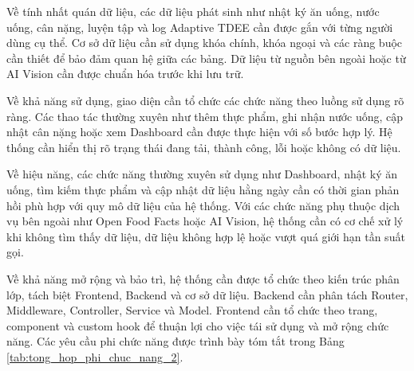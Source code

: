 \documentclass[12pt, a4paper]{report}
\begin{document}
Về tính nhất quán dữ liệu, các dữ liệu phát sinh như nhật ký ăn uống, nước uống, cân nặng, luyện tập và log Adaptive TDEE cần được gắn với từng người dùng cụ thể. Cơ sở dữ liệu cần sử dụng khóa chính, khóa ngoại và các ràng buộc cần thiết để bảo đảm quan hệ giữa các bảng. Dữ liệu từ nguồn bên ngoài hoặc từ AI Vision cần được chuẩn hóa trước khi lưu trữ.

Về khả năng sử dụng, giao diện cần tổ chức các chức năng theo luồng sử dụng rõ ràng. Các thao tác thường xuyên như thêm thực phẩm, ghi nhận nước uống, cập nhật cân nặng hoặc xem Dashboard cần được thực hiện với số bước hợp lý. Hệ thống cần hiển thị rõ trạng thái đang tải, thành công, lỗi hoặc không có dữ liệu.

Về hiệu năng, các chức năng thường xuyên sử dụng như Dashboard, nhật ký ăn uống, tìm kiếm thực phẩm và cập nhật dữ liệu hằng ngày cần có thời gian phản hồi phù hợp với quy mô dữ liệu của hệ thống. Với các chức năng phụ thuộc dịch vụ bên ngoài như Open Food Facts hoặc AI Vision, hệ thống cần có cơ chế xử lý khi không tìm thấy dữ liệu, dữ liệu không hợp lệ hoặc vượt quá giới hạn tần suất gọi.

Về khả năng mở rộng và bảo trì, hệ thống cần được tổ chức theo kiến trúc phân lớp, tách biệt Frontend, Backend và cơ sở dữ liệu. Backend cần phân tách Router, Middleware, Controller, Service và Model. Frontend cần tổ chức theo trang, component và custom hook để thuận lợi cho việc tái sử dụng và mở rộng chức năng. Các yêu cầu phi chức năng được trình bày tóm tắt trong Bảng \ref{tab:tong_hop_phi_chuc_nang_2}.
\end{document}
